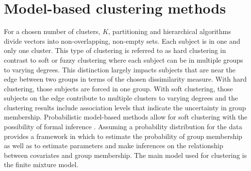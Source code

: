 \section{Model-based clustering methods}
For a chosen number of clusters, $K$, partitioning and hierarchical algorithms divide vectors into non-overlapping, non-empty sets. Each subject is in one and only one cluster. This type of clustering is referred to as hard clustering in contrast to soft or fuzzy clustering where each subject can be in multiple groups to varying degrees. This distinction largely impacts subjects that are near the edge between two groups in terms of the chosen dissimilarity measure. With hard clustering, those subjects are forced in one group. With soft clustering, those subjects on the edge contribute to multiple clusters to varying degrees and the clustering results include association levels that indicate the uncertainty in group membership. Probabilistic model-based methods allow for soft clustering with the possibility of formal inference \cite{fraley2002}. Assuming a probability distribution for the data provides a framework in which to estimate the probability of group membership as well as to estimate parameters and make inferences on the relationship between covariates and group membership. The main model used for clustering is the finite mixture model.


